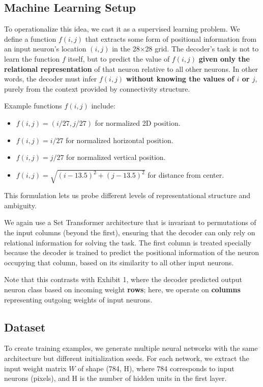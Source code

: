\documentclass[11pt]{article}
\begin{document}
\subsection{Machine Learning Setup}

To operationalize this idea, we cast it as a supervised learning problem. We define a function $f(i, j)$ that extracts some form of positional information from an input neuron's location $(i, j)$ in the 28×28 grid. The decoder's task is not to learn the function $f$ itself, but to predict the value of $f(i, j)$ \textbf{given only the relational representation} of that neuron relative to all other neurons. In other words, the decoder must infer $f(i, j)$ \textbf{without knowing the values of $i$ or $j$}, purely from the context provided by connectivity structure.

Example functions $f(i, j)$ include:

\begin{itemize}
\item $f(i, j) = (i / 27, j / 27)$ for normalized 2D position.
\item $f(i, j) = i / 27$ for normalized horizontal position.
\item $f(i, j) = j / 27$ for normalized vertical position.
\item $f(i, j) = \sqrt{(i - 13.5)^2 + (j - 13.5)^2}$ for distance from center.
\end{itemize}

This formulation lets us probe different levels of representational structure and ambiguity.

We again use a Set Transformer architecture that is invariant to permutations of the input columns (beyond the first), ensuring that the decoder can only rely on relational information for solving the task. The first column is treated specially because the decoder is trained to predict the positional information of the neuron occupying that column, based on its similarity to all other input neurons.

Note that this contrasts with Exhibit 1, where the decoder predicted output neuron class based on incoming weight \textbf{rows}; here, we operate on \textbf{columns} representing outgoing weights of input neurons.

\subsection{Dataset}

To create training examples, we generate multiple neural networks with the same architecture but different initialization seeds. For each network, we extract the input weight matrix $W$ of shape (784, H), where 784 corresponds to input neurons (pixels), and H is the number of hidden units in the first layer.
\end{document}
